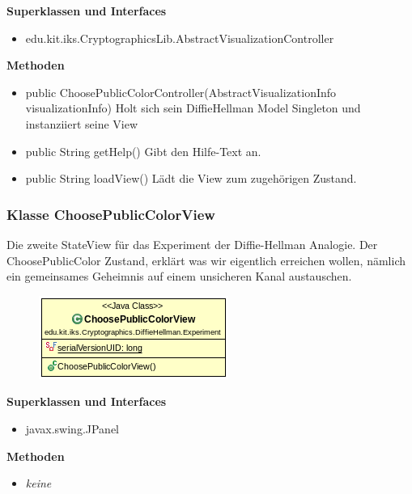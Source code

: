 \documentclass{article}
\begin{document}
      \textbf{Superklassen und Interfaces}
      \begin{itemize}
        \item edu.kit.iks.CryptographicsLib.AbstractVisualizationController
      \end{itemize}

      \textbf{Methoden}
      \begin{itemize}
          \item public ChoosePublicColorController(AbstractVisualizationInfo visualizationInfo) \newline
              Holt sich sein DiffieHellman Model Singleton und instanziiert seine View
        \item public String getHelp() \newline
        Gibt den Hilfe-Text an.
        \item public String loadView() \newline
        Lädt die View zum zugehörigen Zustand.
      \end{itemize}

\subsubsection{Klasse ChoosePublicColorView}
      Die zweite StateView für das Experiment der Diffie-Hellman Analogie.
      Der ChoosePublicColor Zustand, erklärt was wir eigentlich erreichen wollen,
      nämlich ein gemeinsames Geheimnis auf einem unsicheren Kanal austauschen.

      \begin{figure}[H]
        \centering
        \includegraphics{resources/edu-kit-iks-Cryptographics-DiffieHellman-Experiment-ChoosePublicColorView}
      \end{figure}

      \textbf{Superklassen und Interfaces}
      \begin{itemize}
        \item javax.swing.JPanel
      \end{itemize}

      \textbf{Methoden}
      \begin{itemize}
        \item \textit{keine}
      \end{itemize}
\end{document}
